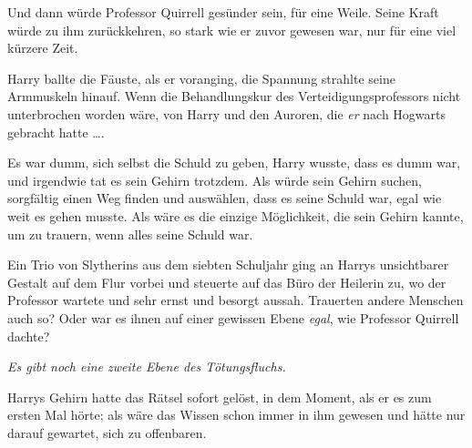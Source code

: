 
Und dann würde Professor Quirrell gesünder sein, für eine Weile. Seine Kraft würde zu ihm zurückkehren, so stark wie er zuvor gewesen war, nur für eine viel kürzere Zeit.

Harry ballte die Fäuste, als er voranging, die Spannung strahlte seine Armmuskeln hinauf. Wenn die Behandlungskur des Verteidigungsprofessors nicht unterbrochen worden wäre, von Harry und den Auroren, die \emph{er} nach Hogwarts gebracht hatte ….

Es war dumm, sich selbst die Schuld zu geben, Harry wusste, dass es dumm war, und irgendwie tat es sein Gehirn trotzdem. Als würde sein Gehirn suchen, sorgfältig einen Weg finden und auswählen, dass es seine Schuld war, egal wie weit es gehen musste. Als wäre es die einzige Möglichkeit, die sein Gehirn kannte, um zu trauern, wenn alles seine Schuld war.

Ein Trio von Slytherins aus dem siebten Schuljahr ging an Harrys unsichtbarer Gestalt auf dem Flur vorbei und steuerte auf das Büro der Heilerin zu, wo der Professor wartete und sehr ernst und besorgt aussah. Trauerten andere Menschen auch so? Oder war es ihnen auf einer gewissen Ebene \emph{egal}, wie Professor Quirrell dachte?

\emph{Es gibt noch eine zweite Ebene des Tötungsfluchs.}

Harrys Gehirn hatte das Rätsel sofort gelöst, in dem Moment, als er es zum ersten Mal hörte; als wäre das Wissen schon immer in ihm gewesen und hätte nur darauf gewartet, sich zu offenbaren.

